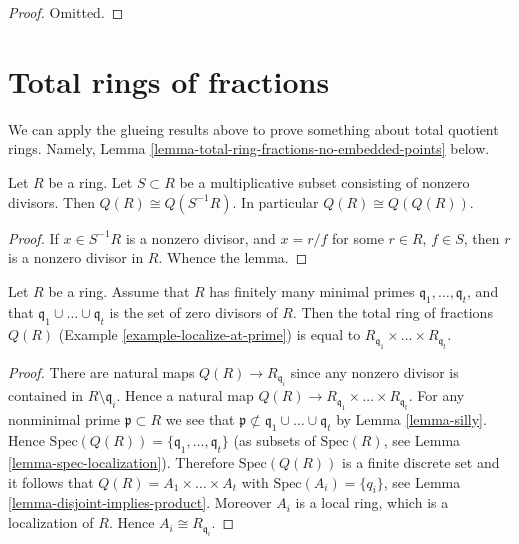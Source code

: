 \begin{proof}
Omitted.
\end{proof}












\section{Total rings of fractions}
\label{section-total-quotient-ring}

\noindent
We can apply the glueing results above to prove something about
total quotient rings. Namely,
Lemma \ref{lemma-total-ring-fractions-no-embedded-points} below.

\begin{lemma}
\label{lemma-total-ring-fractions}
Let $R$ be a ring.
Let $S \subset R$ be a multiplicative subset consisting of nonzero
divisors. Then $Q(R) \cong Q(S^{-1}R)$.
In particular $Q(R) \cong Q(Q(R))$.
\end{lemma}

\begin{proof}
If $x \in S^{-1}R$ is a nonzero divisor, and
$x = r/f$ for some $r \in R$, $f \in S$, then
$r$ is a nonzero divisor in $R$. Whence the lemma.
\end{proof}

\begin{lemma}
\label{lemma-total-ring-fractions-no-embedded-points}
Let $R$ be a ring.
Assume that $R$ has finitely many minimal primes
$\mathfrak q_1, \ldots, \mathfrak q_t$, and that
$\mathfrak q_1 \cup \ldots \cup \mathfrak q_t$ is the set
of zero divisors of $R$.
Then the total ring of fractions $Q(R)$
(Example \ref{example-localize-at-prime}) is equal to
$R_{\mathfrak q_1} \times \ldots \times R_{\mathfrak q_t}$.
\end{lemma}

\begin{proof}
There are natural maps $Q(R) \to R_{\mathfrak q_i}$ since
any nonzero divisor is contained in $R \setminus \mathfrak q_i$.
Hence a natural map
$Q(R) \to R_{\mathfrak q_1} \times \ldots \times R_{\mathfrak q_t}$.
For any nonminimal prime $\mathfrak p \subset R$ we see that
$\mathfrak p \not \subset \mathfrak q_1 \cup \ldots \cup \mathfrak q_t$
by Lemma \ref{lemma-silly}. Hence
$\text{Spec}(Q(R)) = \{\mathfrak q_1, \ldots, \mathfrak q_t\}$
(as subsets of $\text{Spec}(R)$, see Lemma \ref{lemma-spec-localization}).
Therefore $\text{Spec}(Q(R))$ is a finite discrete set and
it follows that $Q(R) = A_1 \times \ldots \times A_t$
with $\text{Spec}(A_i) = \{q_i\}$, see
Lemma \ref{lemma-disjoint-implies-product}.
Moreover $A_i$ is a local ring, which is a localization
of $R$. Hence $A_i \cong R_{\mathfrak q_i}$.
\end{proof}


















